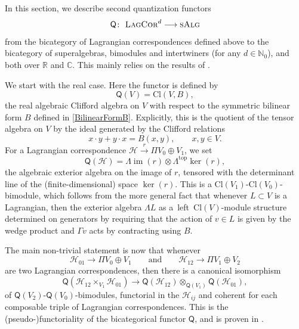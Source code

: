 \documentclass[pdftex]{sigma}
\numberwithin{equation}{section}
\DeclareMathOperator{\im}{\mathrm{im}}
\newcommand{\LagCor}{\textsc{LagCor}}
\newcommand{\R}{\mathbb{R}}
\newcommand{\N}{\mathbb{N}}
\newcommand{\C}{\mathbb{C}}
\newcommand{\Cl}{\mathrm{Cl}}
\begin{document}
In this section, we describe second quantization functors
\begin{equation*}
 \textsf{Q}\colon\ \LagCor^d \longrightarrow \textsc{sAlg}
\end{equation*}
from the bicategory of Lagrangian correspondences defined above to the bicategory of superalgebras, bimodules and intertwiners (for any $d \in \N_0$), and both over $\R$ and $\C$.
This mainly relies on the results of \cite[Section~2]{LudewigRoos}.

We start with the real case.
Here the functor is defined by
\[
 \textsf{Q}(V) = \Cl(V, B),\]
the real algebraic Clifford algebra on $V$ with respect to the symmetric bilinear form $B$ defined in \eqref{BilinearFormB}.
Explicitly, this is the quotient of the tensor algebra on $V$ by the ideal generated by the Clifford relations
\begin{equation*}
 x \cdot y + y \cdot x = B(x, y), \qquad x, y \in V.
\end{equation*}
For a Lagrangian correspondence $\mathcal{H} \stackrel{r}{\to} \Pi V_0 \oplus V_1$, we set
\begin{equation*}
 \textsf{Q}(\mathcal{H}) = \Lambda \im(r) \otimes \Lambda^{\mathrm{top}} \ker(r),
\end{equation*}
the algebraic exterior algebra on the image of $r$, tensored with the determinant line of the (finite-dimensional) space $\ker(r)$.
This is a $\Cl(V_1)$-$\Cl(V_0)$-bimodule, which follows from the more general fact that whenever $L \subset V$ is a Lagrangian, then the exterior algebra $\Lambda L$ as a~left~$\Cl(V)$-module structure determined on generators by requiring that the action of $v \in L$ is given by the wedge product and $\Gamma v$ acts by contracting using $B$.

The main non-trivial statement is now that whenever
\[\mathcal{H}_{01} \to \Pi V_0 \oplus V_1\qquad \text{and}\qquad \mathcal{H}_{12} \to \Pi V_1 \oplus V_2\]
 are two Lagrangian correspondences, then there is a canonical isomorphism
\begin{equation}
\label{CoherenceIsomorphism}
 \textsf{Q}(\mathcal{H}_{12} \times_{V_1} \mathcal{H}_{01}) \longrightarrow \textsf{Q}(\mathcal{H}_{12}) \otimes_{\mathsf{Q}(V_1)} \textsf{Q}(\mathcal{H}_{01}),
\end{equation}
of $\textsf{Q}(V_2)$-$\textsf{Q}(V_0)$-bimodules, functorial in the $\mathcal{H}_{ij}$ and coherent for each composable triple of Lagrangian correspondences.
This is the (pseudo-)functoriality of the bicategorical functor $\textsf{Q}$, and is proven in \cite[Theorems~2.15 and~3.22]{LudewigRoos}.
\end{document}
